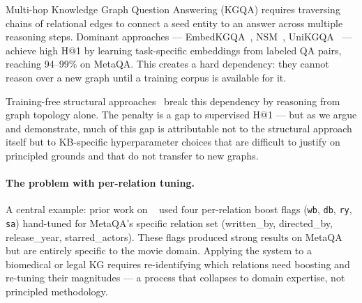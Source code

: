 \documentclass[10pt,twocolumn]{article}
\begin{document}
Multi-hop Knowledge Graph Question Answering (KGQA) requires traversing chains
of relational edges to connect a seed entity to an answer across multiple
reasoning steps. Dominant approaches --- EmbedKGQA~\cite{saxena2020improve},
NSM~\cite{he2021}, UniKGQA~\cite{jiang2023} --- achieve high H@1 by learning
task-specific embeddings from labeled QA pairs, reaching 94--99\% on MetaQA.
This creates a hard dependency: they cannot reason over a new graph until a
training corpus is available for it.

Training-free structural approaches~\cite{buchorn2026report} break this
dependency by reasoning from graph topology alone. The penalty is a gap to
supervised H@1 --- but as we argue and demonstrate, much of this gap is
attributable not to the structural approach itself but to KB-specific
hyperparameter choices that are difficult to justify on principled grounds and
that do not transfer to new graphs.

\paragraph{The problem with per-relation tuning.}
A central example: prior work on \CEREBRUM{}~\cite{buchorn2026report} used four
per-relation boost flags (\texttt{wb}, \texttt{db}, \texttt{ry}, \texttt{sa})
hand-tuned for MetaQA's specific relation set (written\_by, directed\_by,
release\_year, starred\_actors). These flags produced strong results on MetaQA
but are entirely specific to the movie domain. Applying the system to a
biomedical or legal KG requires re-identifying which relations need boosting and
re-tuning their magnitudes --- a process that collapses to domain expertise,
not principled methodology.
\end{document}

